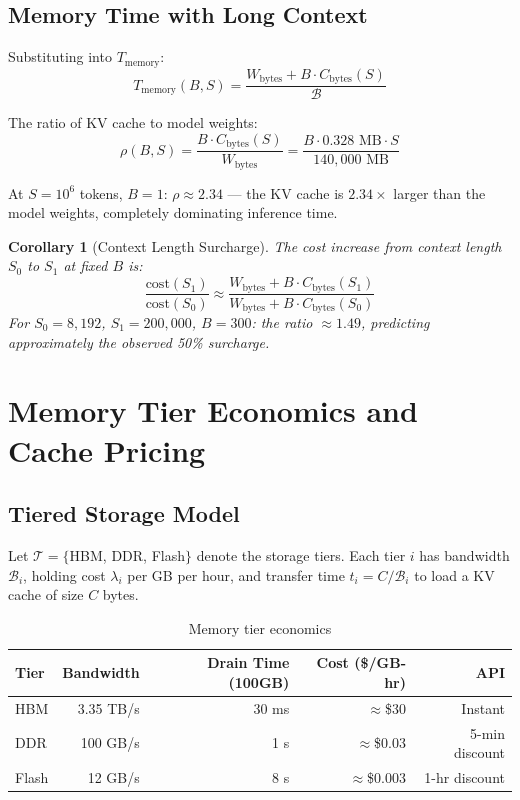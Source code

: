 \documentclass[11pt,a4paper]{article}
\newtheorem{corollary}[theorem]{Corollary}
\newcommand{\Tmem}{T_{\mathrm{memory}}}
\newcommand{\BW}{\mathcal{B}}
\begin{document}
\subsection{Memory Time with Long Context}

Substituting into $\Tmem$:
\[
  \Tmem(B, S) = \frac{W_\text{bytes} + B \cdot C_\text{bytes}(S)}{\BW}
\]

The ratio of KV cache to model weights:
\[
  \rho(B, S) = \frac{B \cdot C_\text{bytes}(S)}{W_\text{bytes}}
             = \frac{B \cdot 0.328 \text{ MB} \cdot S}{140{,}000 \text{ MB}}
\]

At $S = 10^6$ tokens, $B=1$: $\rho \approx 2.34$ — the KV cache is
$2.34\times$ larger than the model weights, completely dominating inference time.

\begin{corollary}[Context Length Surcharge]
The cost increase from context length $S_0$ to $S_1$ at fixed $B$ is:
\[
  \frac{\text{cost}(S_1)}{\text{cost}(S_0)}
  \approx \frac{W_\text{bytes} + B \cdot C_\text{bytes}(S_1)}
               {W_\text{bytes} + B \cdot C_\text{bytes}(S_0)}
\]
For $S_0 = 8{,}192$, $S_1 = 200{,}000$, $B=300$: the ratio $\approx 1.49$,
predicting approximately the observed 50\% surcharge.
\end{corollary}

\section{Memory Tier Economics and Cache Pricing}
\label{sec:tiers}

\subsection{Tiered Storage Model}

Let $\mathcal{T} = \{$HBM, DDR, Flash$\}$ denote the storage tiers.
Each tier $i$ has bandwidth $\BW_i$, holding cost $\lambda_i$ per GB per hour,
and transfer time $t_i = C/\BW_i$ to load a KV cache of size $C$ bytes.

\begin{table}[h]
\centering
\caption{Memory tier economics}
\label{tab:tiers}
\begin{tabular}{lrrrr}
\toprule
\textbf{Tier} & \textbf{Bandwidth} & \textbf{Drain Time (100GB)} & \textbf{Cost (\$/GB-hr)} & \textbf{API} \\
\midrule
HBM   & 3.35 TB/s & 30 ms    & $\approx$\$30  & Instant \\
DDR   & 100 GB/s  & 1 s      & $\approx$\$0.03 & 5-min discount \\
Flash & 12 GB/s   & 8 s      & $\approx$\$0.003 & 1-hr discount \\
\bottomrule
\end{tabular}
\end{table}
\end{document}
